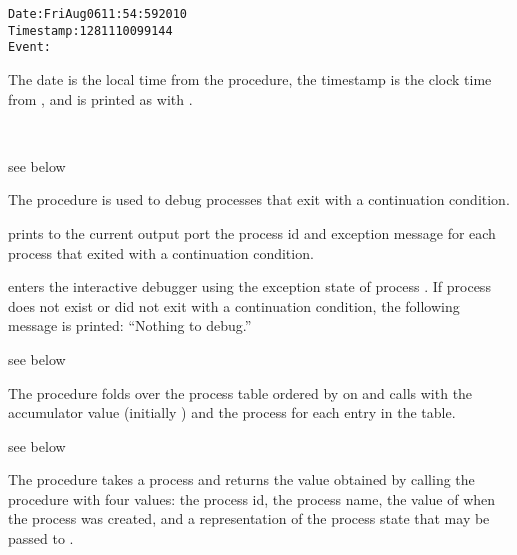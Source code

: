 \begin{alltt}
Date: Fri Aug 06 11:54:59 2010
Timestamp: 1281110099144
Event: 
\end{alltt}

The date is the local time from the  procedure,
the timestamp is the clock time from , and
 is printed as with .

\begin{procedure}
  \\
\end{procedure}
\returns{} see below

The  procedure is used to debug processes that exit with a
continuation condition.

 prints to the current output port the process id and
exception message for each process that exited with a continuation
condition.

 enters the interactive debugger using the
exception state of process . If process  does not
exist or did not exit with a continuation condition, the following
message is printed: ``Nothing to debug.''

\begin{procedure}
\end{procedure}
\returns{} see below

The  procedure folds over the process table
ordered by  on  and calls 
with the accumulator value (initially ) and the process
for each entry in the table.

\begin{procedure}
\end{procedure}
\returns{} see below

The  procedure takes a process 
and returns the value obtained by calling the procedure 
with four values:
the process id,
the process name,
the value of  when the process was created,
and a representation of the process state
that may be passed to .

